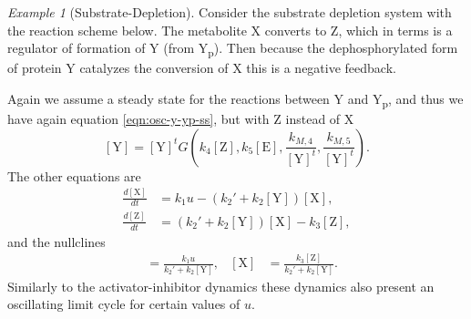 \documentclass[a4paper]{article}
\newcommand{\co}[1]{[\text{#1}]} %
\theoremstyle{plain}
\theoremstyle{definition}
\theoremstyle{remark}
\newtheorem*{example}{Example}
\begin{document}
\begin{example}[Substrate-Depletion]
  Consider the substrate depletion system with the reaction scheme below. The
  metabolite X converts to Z, which in terms is a regulator of formation of Y
  (from Y\textsubscript{p}). Then because the dephosphorylated form of protein
  Y catalyzes the conversion of X this is a negative feedback.
  \begin{center}
  \end{center}
  Again we assume a steady state for the reactions between Y and
  Y\textsubscript{p}, and thus we have again equation \eqref{eqn:osc-y-yp-ss},
  but with Z instead of X
  \[
    \co{Y} = \co{Y}^t G\left(
      k_4 \co{Z}, k_5 \co{E},
      \frac{k_{M,4}}{\co{Y}^t},
      \frac{k_{M,5}}{\co{Y}^t}
    \right).
  \]
  The other equations are
  \begin{align*}
    \frac{d\co{X}}{dt} &= k_1 u - (k_2' + k_2 \co{Y}) \co{X}, \\
    \frac{d\co{Z}}{dt} &= (k_2' + k_2 \co{Y}) \co{X} - k_3 \co{Z},
  \end{align*}
  and the nullclines
  \begin{align*}
    \co{X} &= \frac{k_1 u}{k_2' + k_2 \co{Y}}, &
    \co{X} &= \frac{k_3 \co{Z}}{k_2' + k_2 \co{Y}}.
  \end{align*}
  Similarly to the activator-inhibitor dynamics these dynamics also present an
  oscillating limit cycle for certain values of $u$.
\end{example}
\end{document}
